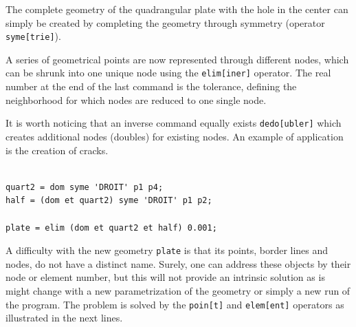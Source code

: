 \begin{castemcom}
The complete geometry of the quadrangular plate with the 
hole in the center can simply be created by completing 
the geometry through symmetry (operator \texttt{syme[trie]}). 

A series of geometrical points are now represented through 
different nodes, which can be shrunk into one unique node 
using the \texttt{elim[iner]} operator. The real number 
at the end of the last command is the tolerance, defining 
the neighborhood for which nodes are reduced to one 
single node.

It is worth noticing that an inverse command equally 
exists \texttt{dedo[ubler]} which creates additional nodes (doubles) 
for existing nodes. An example of application is the 
creation of cracks. 


\end{castemcom}
\begin{castemlines}
\begin{verbatim}
 
quart2 = dom syme 'DROIT' p1 p4;
half = (dom et quart2) syme 'DROIT' p1 p2;

plate = elim (dom et quart2 et half) 0.001;

\end{verbatim}
\end{castemlines}

A difficulty with the new geometry \texttt{plate} is that its 
points, border lines and nodes, do not have a distinct name. 
Surely, one can address these objects by their node or element
number, but this will not provide an intrinsic solution as 
is might change with a new parametrization of the geometry 
or simply a new run of the program. The problem is solved 
by the \texttt{poin[t]} and \texttt{elem[ent]} operators as
illustrated in the next lines.
 
